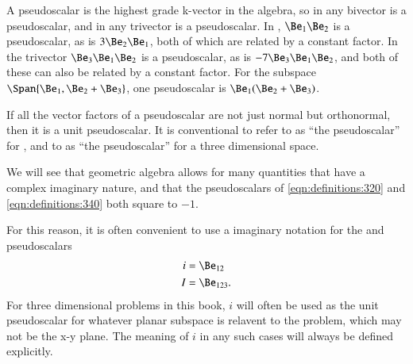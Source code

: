 
A pseudoscalar is the highest grade k-vector in the algebra, so in
 any bivector is a pseudoscalar, and in  any trivector is a pseudoscalar.
In , \( \Be_1 \Be_2 \) is a pseudoscalar, as is \( 3 \Be_2 \Be_1 \), both of which are related by a constant factor.
In  the trivector \( \Be_3 \Be_1 \Be_2 \) is a pseudoscalar, as is \( - 7 \Be_3 \Be_1 \Be_2 \), and both of these can also be related by a constant factor.
For the subspace \( \Span{ \Be_1, \Be_2 + \Be_3} \), one pseudoscalar is \( \Be_1(\Be_2 + \Be_3) \).

If all the vector factors of a pseudoscalar are not just normal but orthonormal, then it is a unit pseudoscalar.
It is conventional to refer to
as ``the pseudoscalar'' for , and to
as ``the pseudoscalar'' for a three dimensional space.

We will see that geometric algebra allows for many quantities that have a complex imaginary nature, and that the pseudoscalars of \cref{eqn:definitions:320} and \cref{eqn:definitions:340} both square to \(-1\).

For this reason, it is often convenient to use a imaginary notation for the  and  pseudoscalars
\begin{dmath}\label{eqn:multivector_nomenclature:42}
\begin{aligned}
i &= \Be_{12} \\
I &= \Be_{123}.
\end{aligned}
\end{dmath}
For three dimensional problems in this book, \( i \) will often be used as the unit pseudoscalar for whatever planar subspace is relavent to the problem, which may not be the x-y plane.
The meaning of \( i \) in any such cases will always be defined explicitly.

